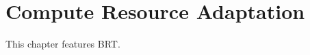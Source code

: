 \chapter{Compute Resource Adaptation}
\label{cha:comp-reso-adapt}

This chapter features BRT.











